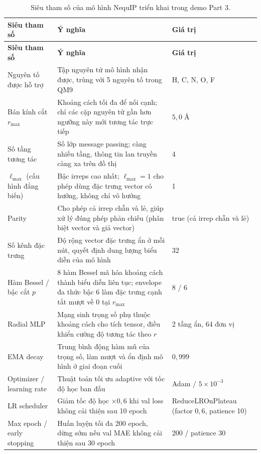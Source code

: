 \begingroup
\small
\renewcommand{\arraystretch}{1.25}
\setlength{\LTpre}{0.7\baselineskip}
\setlength{\LTpost}{0.9\baselineskip}
\begin{longtable}{@{}p{3.2cm} p{7.4cm} p{3.5cm}@{}}
\caption{Siêu tham số của mô hình NequIP triển khai trong demo Part 3.}
\label{tab:demo-part3-arch}\\
\toprule
\rowcolor{gray!20}
\textbf{Siêu tham số} & \textbf{Ý nghĩa} & \textbf{Giá trị} \\
\midrule
\endfirsthead
\toprule
\rowcolor{gray!20}
\textbf{Siêu tham số} & \textbf{Ý nghĩa} & \textbf{Giá trị} \\
\midrule
\endhead
Nguyên tố được hỗ trợ & Tập nguyên tử mô hình nhận được, trùng với 5 nguyên tố trong QM9 & H, C, N, O, F \\
Bán kính cắt $r_{\max}$ & Khoảng cách tối đa để nối cạnh; chỉ các cặp nguyên tử gần hơn ngưỡng này mới tương tác trực tiếp & $5{,}0\;\text{\AA}$ \\
Số tầng tương tác & Số lớp message passing; càng nhiều tầng, thông tin lan truyền càng xa trên đồ thị & 4 \\
$\ell_{\max}$ (cấu hình đẳng biến) & Bậc irreps cao nhất; $\ell_{\max}=1$ cho phép dùng đặc trưng vector có hướng, không chỉ vô hướng & 1 \\
Parity & Cho phép cả irrep chẵn và lẻ, giúp xử lý đúng phép phản chiếu (phân biệt vector và giả vector) & true (cả irrep chẵn và lẻ) \\
Số kênh đặc trưng & Độ rộng vector đặc trưng ẩn ở mỗi nút, quyết định dung lượng biểu diễn của mô hình & 32 \\
Hàm Bessel / bậc cắt $p$ & 8 hàm Bessel mã hóa khoảng cách thành biểu diễn liên tục; envelope đa thức bậc 6 làm đặc trưng cạnh tắt mượt về 0 tại $r_{\max}$ & 8 / 6 \\
Radial MLP & Mạng sinh trọng số phụ thuộc khoảng cách cho tích tensor, điều khiển cường độ tương tác theo $r$ & 2 tầng ẩn, 64 đơn vị \\
EMA decay & Trung bình động hàm mũ của trọng số, làm mượt và ổn định mô hình ở giai đoạn cuối & $0{,}999$ \\
Optimizer / learning rate & Thuật toán tối ưu adaptive với tốc độ học ban đầu & Adam / $5{\times}10^{-3}$ \\
LR scheduler & Giảm tốc độ học $\times 0{,}6$ khi val loss không cải thiện sau 10 epoch & ReduceLROnPlateau (factor $0{,}6$, patience 10) \\
Max epoch / early stopping & Huấn luyện tối đa 200 epoch, dừng sớm nếu val MAE không cải thiện sau 30 epoch & 200 / patience 30 \\
\bottomrule
\end{longtable}
\endgroup
